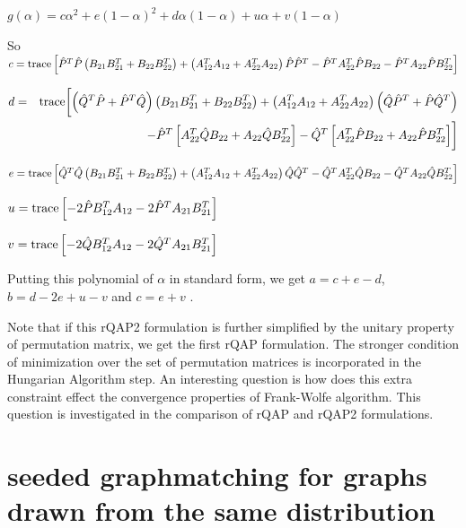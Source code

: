 \documentclass[12pt]{article}
\newcommand{\tr}{\textup{trace}}
\begin{document}
$g\left(\alpha\right)=c\alpha^{2}+e(1-\alpha)^{2}+d\alpha(1-\alpha)+u\alpha+v(1-\alpha)$

So $c=\tr\left[\hat{P}^{T}\hat{P}\left(B_{21}B_{21}^{T}+B_{22}B_{22}^{T}\right)+\left(A_{12}^{T}A_{12}+A_{22}^{T}A_{22}\right)\hat{P}\hat{P}^{T}-\hat{P}^{T}A_{22}^{T}\hat{P}B_{22}-\hat{P}^{T}A_{22}\hat{P}B_{22}^{T}\right]$

\noindent 
\begin{eqnarray*}
d & = & \tr\biggl[\left(\hat{Q}^{T}\hat{P}+\hat{P}^{T}\hat{Q}\right)\left(B_{21}B_{21}^{T}+B_{22}B_{22}^{T}\right)+\left(A_{12}^{T}A_{12}+A_{22}^{T}A_{22}\right)\left(\hat{Q}\hat{P}^{T}+\hat{P}\hat{Q}^{T}\right)\\
 &  & -\hat{P}^{T}\left[A_{22}^{T}\hat{Q}B_{22}+A_{22}\hat{Q}B_{22}^{T}\right]-\hat{Q}^{T}\left[A_{22}^{T}\hat{P}B_{22}+A_{22}\hat{P}B_{22}^{T}\right]\biggr]
\end{eqnarray*}


$e=\tr\left[\hat{Q}^{T}\hat{Q}\left(B_{21}B_{21}^{T}+B_{22}B_{22}^{T}\right)+\left(A_{12}^{T}A_{12}+A_{22}^{T}A_{22}\right)\hat{Q}\hat{Q}^{T}-\hat{Q}^{T}A_{22}^{T}\hat{Q}B_{22}-\hat{Q}^{T}A_{22}\hat{Q}B_{22}^{T}\right]$

$u=\tr\left[-2\hat{P}B_{12}^{T}A_{12}-2\hat{P}^{T}A_{21}B_{21}^{T}\right]$

$v=\tr\left[-2\hat{Q}B_{12}^{T}A_{12}-2\hat{Q}^{T}A_{21}B_{21}^{T}\right]$

Putting this polynomial of $\alpha$ in standard form, we get $a=c+e-d$,
$b=d-2e+u-v$ and $c=e+v$ .

Note that if this rQAP2 formulation is further simplified  by the unitary property of permutation  matrix, we get the first rQAP formulation. The stronger condition of minimization over the set of permutation matrices is incorporated in the Hungarian Algorithm step.
An interesting question is how does this extra constraint effect the convergence properties of Frank-Wolfe algorithm.  This question is investigated in the comparison of rQAP and rQAP2 formulations.  



\section{seeded graphmatching for graphs drawn from the same distribution}
\end{document}
